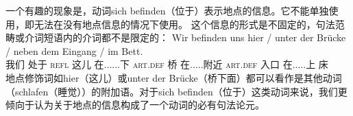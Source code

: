 一个有趣的现象是，动词sich befinden（位于）表示地点的信息。它不能单独使用，即无法在没有地点信息的情况下使用。
\z
这个信息的形式是不固定的，句法范畴或介词短语内的介词都不是限定的：
\ea
\gll Wir befinden uns hier / unter der Brücke / neben dem Eingang / im Bett.\\
	 我们 处于 \textsc{refl} 这儿 {} 在......下 \textsc{art}.\textsc{def} 桥 {} 在.....附近 \textsc{art}.\textsc{def} 入口 {} 在.....上 床\\
\z
地点修饰词如hier（这儿）或unter der Brücke（桥下面）都可以看作是其他动词（\egc schlafen（睡觉））的附加语。对于sich befinden（位于）这类动词来说，我们更倾向于认为关于地点的信息构成了一个动词的必有句法论元。
%
%
